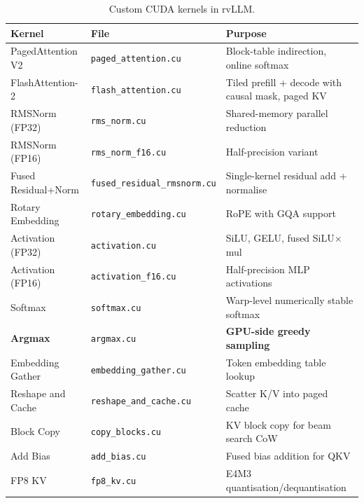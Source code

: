 \documentclass[11pt,a4paper]{article}
\newcommand{\thead}[1]{\textbf{#1}}
\begin{document}
\begin{table}[t]
  \centering
  \caption{Custom CUDA kernels in rvLLM.}
  \label{tab:kernels}
  \small
  \begin{tabular}{@{}llp{4.8cm}@{}}
    \toprule
    \rowcolor{HeaderBlue} \thead{Kernel} & \thead{File} & \thead{Purpose} \\
    \midrule
    PagedAttention V2   & \texttt{paged\_attention.cu}         & Block-table indirection, online softmax \\
    \rowcolor{gray!8}
    FlashAttention-2    & \texttt{flash\_attention.cu}          & Tiled prefill + decode with causal mask, paged KV \\
    RMSNorm (FP32)      & \texttt{rms\_norm.cu}                & Shared-memory parallel reduction \\
    \rowcolor{gray!8}
    RMSNorm (FP16)      & \texttt{rms\_norm\_f16.cu}            & Half-precision variant \\
    Fused Residual+Norm  & \texttt{fused\_residual\_rmsnorm.cu}  & Single-kernel residual add + normalise \\
    \rowcolor{gray!8}
    Rotary Embedding     & \texttt{rotary\_embedding.cu}         & RoPE with GQA support \\
    Activation (FP32)    & \texttt{activation.cu}               & SiLU, GELU, fused SiLU$\times$mul \\
    \rowcolor{gray!8}
    Activation (FP16)    & \texttt{activation\_f16.cu}           & Half-precision MLP activations \\
    Softmax              & \texttt{softmax.cu}                  & Warp-level numerically stable softmax \\
    \rowcolor{gray!8}
    \textbf{Argmax}      & \texttt{argmax.cu}                   & \textbf{GPU-side greedy sampling} \\
    Embedding Gather     & \texttt{embedding\_gather.cu}         & Token embedding table lookup \\
    \rowcolor{gray!8}
    Reshape and Cache    & \texttt{reshape\_and\_cache.cu}       & Scatter K/V into paged cache \\
    Block Copy           & \texttt{copy\_blocks.cu}              & KV block copy for beam search CoW \\
    \rowcolor{gray!8}
    Add Bias             & \texttt{add\_bias.cu}                & Fused bias addition for QKV \\
    FP8 KV               & \texttt{fp8\_kv.cu}                  & E4M3 quantisation/dequantisation \\
    \bottomrule
  \end{tabular}
\end{table}
\end{document}
